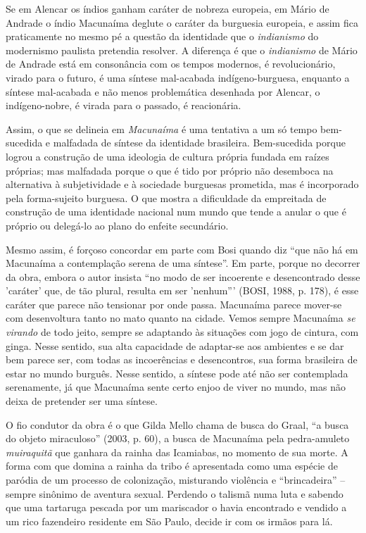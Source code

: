 Se em Alencar os índios ganham caráter de nobreza europeia, em Mário de
Andrade o índio Macunaíma deglute o caráter da burguesia europeia, e
assim fica praticamente no mesmo pé a questão da identidade que o
\emph{indianismo} do modernismo paulista pretendia resolver. A diferença
é que o \emph{indianismo} de Mário de Andrade está em consonância com os
tempos modernos, é revolucionário, virado para o futuro, é uma síntese
mal-acabada indígeno-burguesa, enquanto a síntese mal-acabada e não
menos problemática desenhada por Alencar, o indígeno-nobre, é virada
para o passado, é reacionária.

Assim, o que se delineia em \emph{Macunaíma} é uma tentativa a um só
tempo bem-sucedida e malfadada de síntese da identidade brasileira.
Bem-sucedida porque logrou a construção de uma ideologia de cultura
própria fundada em raízes próprias; mas malfadada porque o que é tido
por próprio não desemboca na alternativa à subjetividade e à sociedade
burguesas prometida, mas é incorporado pela forma-sujeito burguesa. O
que mostra a dificuldade da empreitada de construção de uma identidade
nacional num mundo que tende a anular o que é próprio ou delegá-lo ao
plano do enfeite secundário.

Mesmo assim, é forçoso concordar em parte com Bosi quando diz ``que não
há em Macunaíma a contemplação serena de uma síntese''. Em parte, porque
no decorrer da obra, embora o autor insista ``no modo de ser incoerente
e desencontrado desse 'caráter' que, de tão plural, resulta em ser
'nenhum''' (BOSI, 1988, p. 178), é esse caráter que parece não tensionar
por onde passa. Macunaíma parece mover-se com desenvoltura tanto no mato
quanto na cidade. Vemos sempre Macunaíma \emph{se virando} de todo
jeito, sempre se adaptando às situações com jogo de cintura, com ginga.
Nesse sentido, sua alta capacidade de adaptar-se aos ambientes e se dar
bem parece ser, com todas as incoerências e desencontros, sua forma
brasileira de estar no mundo burguês. Nesse sentido, a síntese pode até
não ser contemplada serenamente, já que Macunaíma sente certo enjoo de
viver no mundo, mas não deixa de pretender ser uma síntese.

O fio condutor da obra é o que Gilda Mello chama de busca do Graal, ``a
busca do objeto miraculoso'' (2003, p. 60), a busca de Macunaíma pela
pedra-amuleto \emph{muiraquitã} que ganhara da rainha das Icamiabas, no
momento de sua morte. A forma com que domina a rainha da tribo é
apresentada como uma espécie de paródia de um processo de colonização,
misturando violência e ``brincadeira'' -- sempre sinônimo de aventura
sexual. Perdendo o talismã numa luta e sabendo que uma tartaruga pescada
por um mariscador o havia encontrado e vendido a um rico fazendeiro
residente em São Paulo, decide ir com os irmãos para lá.

